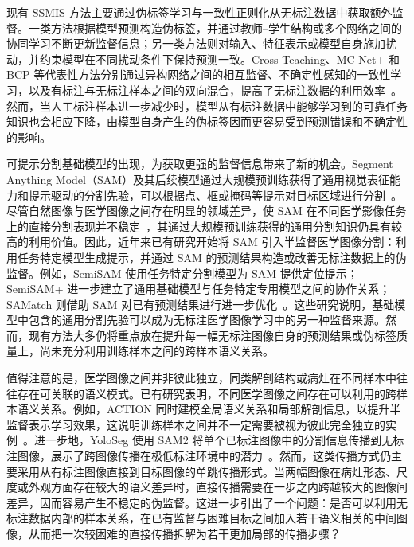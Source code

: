 \documentclass[UTF8,a4paper,10pt,twocolumn]{ctexart}
\begin{document}
现有 SSMIS 方法主要通过伪标签学习与一致性正则化从无标注数据中获取额外监督。一类方法根据模型预测构造伪标签，并通过教师--学生结构或多个网络之间的协同学习不断更新监督信息；另一类方法则对输入、特征表示或模型自身施加扰动，并约束模型在不同扰动条件下保持预测一致。Cross Teaching、MC-Net+ 和 BCP 等代表性方法分别通过异构网络之间的相互监督、不确定性感知的一致性学习，以及有标注与无标注样本之间的双向混合，提高了无标注数据的利用效率~\cite{luo2022crossteaching,wu2022mcnet,bai2023bcp}。然而，当人工标注样本进一步减少时，模型从有标注数据中能够学习到的可靠任务知识也会相应下降，由模型自身产生的伪标签因而更容易受到预测错误和不确定性的影响。

可提示分割基础模型的出现，为获取更强的监督信息带来了新的机会。Segment Anything Model（SAM）及其后续模型通过大规模预训练获得了通用视觉表征能力和提示驱动的分割先验，可以根据点、框或掩码等提示对目标区域进行分割~\cite{kirillov2023segment}。尽管自然图像与医学图像之间存在明显的领域差异，使 SAM 在不同医学影像任务上的直接分割表现并不稳定~\cite{mazurowski2023samexperiment,ma2024medsam}，其通过大规模预训练获得的通用分割知识仍具有较高的利用价值。因此，近年来已有研究开始将 SAM 引入半监督医学图像分割：利用任务特定模型生成提示，并通过 SAM 的预测结果构造或改善无标注数据上的伪监督。例如，SemiSAM 使用任务特定分割模型为 SAM 提供定位提示；SemiSAM+ 进一步建立了通用基础模型与任务特定专用模型之间的协作关系；SAMatch 则借助 SAM 对已有预测结果进行进一步优化~\cite{zhang2023semisam,zhang2025semisamplus,xu2024samatch}。这些研究说明，基础模型中包含的通用分割先验可以成为无标注医学图像学习中的另一种监督来源。然而，现有方法大多仍将重点放在提升每一幅无标注图像自身的预测结果或伪标签质量上，尚未充分利用训练样本之间的跨样本语义关系。

值得注意的是，医学图像之间并非彼此独立，同类解剖结构或病灶在不同样本中往往存在可关联的语义模式。已有研究表明，不同医学图像之间存在可以利用的跨样本语义关系。例如，ACTION 同时建模全局语义关系和局部解剖信息，以提升半监督表示学习效果，这说明训练样本之间并不一定需要被视为彼此完全独立的实例~\cite{you2022action}。进一步地，YoloSeg 使用 SAM2 将单个已标注图像中的分割信息传播到无标注图像，展示了跨图像传播在极低标注环境中的潜力~\cite{zhang2026yoloseg}。然而，这类传播方式仍主要采用从有标注图像直接到目标图像的单跳传播形式。当两幅图像在病灶形态、尺度或外观方面存在较大的语义差异时，直接传播需要在一步之内跨越较大的图像间差异，因而容易产生不稳定的伪监督。这进一步引出了一个问题：是否可以利用无标注数据内部的样本关系，在已有监督与困难目标之间加入若干语义相关的中间图像，从而把一次较困难的直接传播拆解为若干更加局部的传播步骤？
\end{document}
